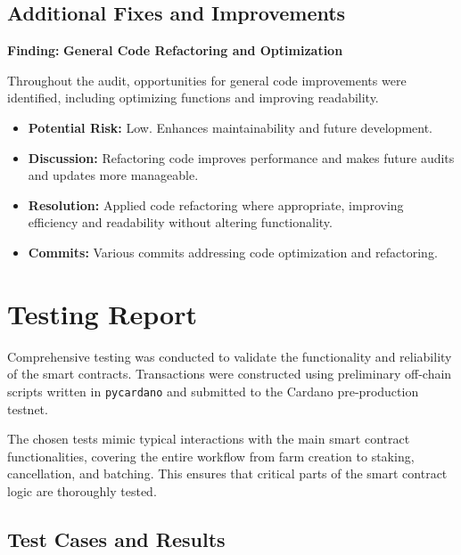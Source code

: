 \documentclass{article}
\begin{document}
\subsection{Additional Fixes and Improvements}

\begin{minorbox}
\textbf{Finding:} \textbf{General Code Refactoring and Optimization}

Throughout the audit, opportunities for general code improvements were identified, including optimizing functions and improving readability.

\begin{itemize}[label=$\diamond$]
    \item \textbf{Potential Risk:} Low. Enhances maintainability and future development.
    \item \textbf{Discussion:} Refactoring code improves performance and makes future audits and updates more manageable.
    \item \textbf{Resolution:} Applied code refactoring where appropriate, improving efficiency and readability without altering functionality.
    \item \textbf{Commits:} Various commits addressing code optimization and refactoring.
\end{itemize}
\end{minorbox}

\section{Testing Report}

Comprehensive testing was conducted to validate the functionality and reliability of the smart contracts. Transactions were constructed using preliminary off-chain scripts written in \texttt{pycardano} and submitted to the Cardano pre-production testnet.

The chosen tests mimic typical interactions with the main smart contract functionalities, covering the entire workflow from farm creation to staking, cancellation, and batching. This ensures that critical parts of the smart contract logic are thoroughly tested.

\subsection{Test Cases and Results}
\end{document}
